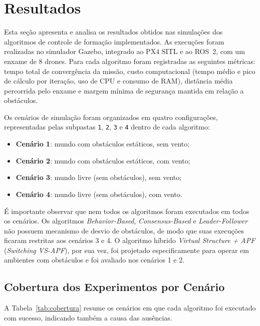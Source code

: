 \section{Resultados}
\label{sec:resultados}

Esta seção apresenta e analisa os resultados obtidos nas simulações dos algoritmos de controle de formação implementados. As execuções foram realizadas no simulador Gazebo, integrado ao PX4 SITL e ao ROS~2, com um enxame de 8 drones. Para cada algoritmo foram registradas as seguintes métricas: tempo total de convergência da missão, custo computacional (tempo médio e pico de cálculo por iteração, uso de CPU e consumo de RAM), distância média percorrida pelo enxame e margem mínima de segurança mantida em relação a obstáculos.

Os cenários de simulação foram organizados em quatro configurações, representadas pelas subpastas \texttt{1}, \texttt{2}, \texttt{3} e \texttt{4} dentro de cada algoritmo:

\begin{itemize}
    \item \textbf{Cenário 1}: mundo com obstáculos estáticos, sem vento;
    \item \textbf{Cenário 2}: mundo com obstáculos estáticos, com vento;
    \item \textbf{Cenário 3}: mundo livre (sem obstáculos), sem vento;
    \item \textbf{Cenário 4}: mundo livre (sem obstáculos), com vento.
\end{itemize}

É importante observar que nem todos os algoritmos foram executados em todos os cenários. Os algoritmos \textit{Behavior-Based}, \textit{Consensus-Based} e \textit{Leader-Follower} não possuem mecanismo de desvio de obstáculos, de modo que suas execuções ficaram restritas aos cenários 3 e 4. O algoritmo híbrido \textit{Virtual Structure + APF} (\textit{Switching VS-APF}), por sua vez, foi projetado especificamente para operar em ambientes com obstáculos e foi avaliado nos cenários 1 e 2.

\subsection{Cobertura dos Experimentos por Cenário}

A Tabela~\ref{tab:cobertura} resume os cenários em que cada algoritmo foi executado com sucesso, indicando também a causa das ausências.

